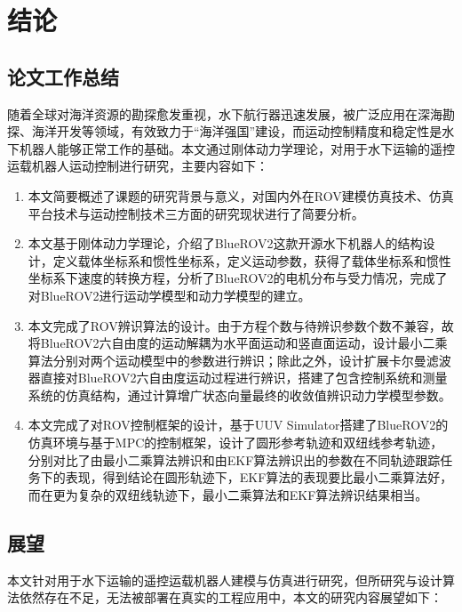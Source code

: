 \chapter{结论}
\section{论文工作总结}

随着全球对海洋资源的勘探愈发重视，水下航行器迅速发展，被广泛应用在深海勘探、海洋开发等领域，有效致力于“海洋强国”建设，而运动控制精度和稳定性是水下机器人能够正常工作的基础。本文通过刚体动力学理论，对用于水下运输的遥控运载机器人运动控制进行研究，主要内容如下：

\begin{enumerate}
    \item 本文简要概述了课题的研究背景与意义，对国内外在ROV建模仿真技术、仿真平台技术与运动控制技术三方面的研究现状进行了简要分析。
    \item 本文基于刚体动力学理论，介绍了BlueROV2这款开源水下机器人的结构设计，定义载体坐标系和惯性坐标系，定义运动参数，获得了载体坐标系和惯性坐标系下速度的转换方程，分析了BlueROV2的电机分布与受力情况，完成了对BlueROV2进行运动学模型和动力学模型的建立。
    \item 本文完成了ROV辨识算法的设计。由于方程个数与待辨识参数个数不兼容，故将BlueROV2六自由度的运动解耦为水平面运动和竖直面运动，设计最小二乘算法分别对两个运动模型中的参数进行辨识；除此之外，设计扩展卡尔曼滤波器直接对BlueROV2六自由度运动过程进行辨识，搭建了包含控制系统和测量系统的仿真结构，通过计算增广状态向量最终的收敛值辨识动力学模型参数。
    \item 本文完成了对ROV控制框架的设计，基于UUV Simulator搭建了BlueROV2的仿真环境与基于MPC的控制框架，设计了圆形参考轨迹和双纽线参考轨迹，分别对比了由最小二乘算法辨识和由EKF算法辨识出的参数在不同轨迹跟踪任务下的表现，得到结论在圆形轨迹下，EKF算法的表现要比最小二乘算法好，而在更为复杂的双纽线轨迹下，最小二乘算法和EKF算法辨识结果相当。
\end{enumerate}

\section{展望}

本文针对用于水下运输的遥控运载机器人建模与仿真进行研究，但所研究与设计算法依然存在不足，无法被部署在真实的工程应用中，本文的研究内容展望如下：

